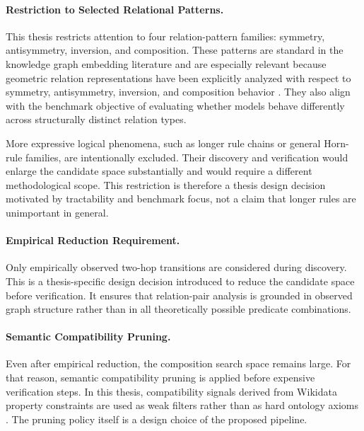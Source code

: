\documentclass[12pt,a4paper]{article}
\begin{document}
\paragraph{Restriction to Selected Relational Patterns.}

This thesis restricts attention to four relation-pattern families: symmetry, antisymmetry, inversion, and composition. These patterns are standard in the knowledge graph embedding literature and are especially relevant because geometric relation representations have been explicitly analyzed with respect to symmetry, antisymmetry, inversion, and composition behavior \cite{sun2019rotate}. They also align with the benchmark objective of evaluating whether models behave differently across structurally distinct relation types.

More expressive logical phenomena, such as longer rule chains or general Horn-rule families, are intentionally excluded. Their discovery and verification would enlarge the candidate space substantially and would require a different methodological scope. This restriction is therefore a thesis design decision motivated by tractability and benchmark focus, not a claim that longer rules are unimportant in general.

\paragraph{Empirical Reduction Requirement.}

Only empirically observed two-hop transitions are considered during discovery. This is a thesis-specific design decision introduced to reduce the candidate space before verification. It ensures that relation-pair analysis is grounded in observed graph structure rather than in all theoretically possible predicate combinations.

\paragraph{Semantic Compatibility Pruning.}

Even after empirical reduction, the composition search space remains large. For that reason, semantic compatibility pruning is applied before expensive verification steps. In this thesis, compatibility signals derived from Wikidata property constraints are used as weak filters rather than as hard ontology axioms \cite{wikidata_constraints_portal,wikidata_inverse_constraint}. The pruning policy itself is a design choice of the proposed pipeline.
\end{document}
